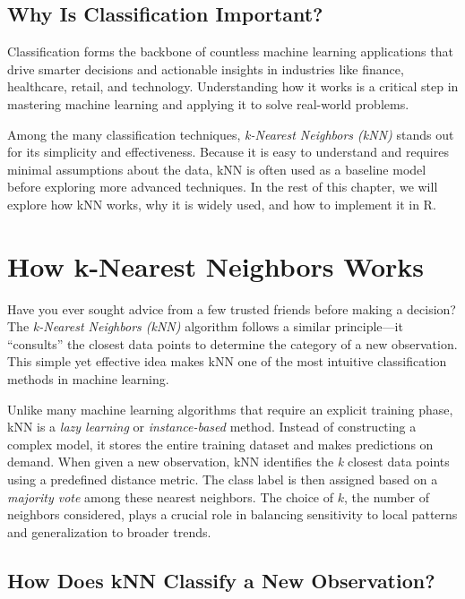 \documentclass[
  11pt,
]{book}
\theoremstyle{definition}
\theoremstyle{definition}
\theoremstyle{definition}
\theoremstyle{definition}
\theoremstyle{remark}
\begin{document}
\subsection*{Why Is Classification Important?}\label{why-is-classification-important}


Classification forms the backbone of countless machine learning applications that drive smarter decisions and actionable insights in industries like finance, healthcare, retail, and technology. Understanding how it works is a critical step in mastering machine learning and applying it to solve real-world problems.

Among the many classification techniques, \emph{k-Nearest Neighbors (kNN)} stands out for its simplicity and effectiveness. Because it is easy to understand and requires minimal assumptions about the data, kNN is often used as a baseline model before exploring more advanced techniques. In the rest of this chapter, we will explore how kNN works, why it is widely used, and how to implement it in R.

\section{How k-Nearest Neighbors Works}\label{how-k-nearest-neighbors-works}

Have you ever sought advice from a few trusted friends before making a decision? The \emph{k-Nearest Neighbors (kNN)} algorithm follows a similar principle---it ``consults'' the closest data points to determine the category of a new observation. This simple yet effective idea makes kNN one of the most intuitive classification methods in machine learning.

Unlike many machine learning algorithms that require an explicit training phase, kNN is a \emph{lazy learning} or \emph{instance-based} method. Instead of constructing a complex model, it stores the entire training dataset and makes predictions on demand. When given a new observation, kNN identifies the \emph{k} closest data points using a predefined distance metric. The class label is then assigned based on a \emph{majority vote} among these nearest neighbors. The choice of \(k\), the number of neighbors considered, plays a crucial role in balancing sensitivity to local patterns and generalization to broader trends.

\subsection*{How Does kNN Classify a New Observation?}\label{how-does-knn-classify-a-new-observation}
\end{document}
